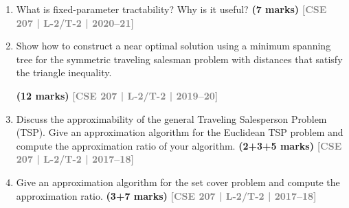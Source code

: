 \documentclass[12pt]{article}
\newcommand{\yr}[1]{\hfill\textcolor{gray}{\small\textbf{[#1]}}}
\newcommand{\mk}[1]{\textcolor{orange!70!black}{\small\textbf{(#1 marks)}}}
\begin{document}
\begin{enumerate}
\item What is fixed-parameter tractability? Why is it useful?
\mk{7} \yr{CSE 207 | L-2/T-2 | 2020--21}


\item Show how to construct a near optimal solution using a minimum spanning tree for the symmetric traveling salesman problem with distances that satisfy the triangle inequality.
\begin{center}
\end{center}

\mk{12} \yr{CSE 207 | L-2/T-2 | 2019--20}



\item Discuss the approximability of the general Traveling Salesperson Problem (TSP). Give an approximation algorithm for the Euclidean TSP problem and compute the approximation ratio of your algorithm. \mk{2+3+5}
\yr{CSE 207 | L-2/T-2 | 2017--18}


\item Give an approximation algorithm for the set cover problem and compute the approximation ratio. \mk{3+7}
\yr{CSE 207 | L-2/T-2 | 2017--18}



\end{enumerate}
\end{document}
